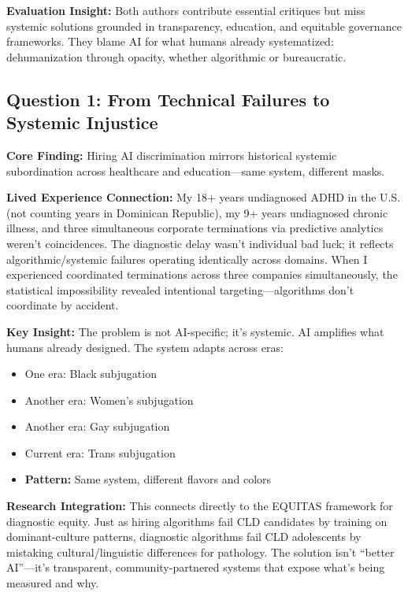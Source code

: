 \documentclass[12pt,letterpaper]{article}
\begin{document}
\vspace{-4pt}
\begin{criticalinsight}
\textbf{Evaluation Insight:} Both authors contribute essential critiques but miss systemic solutions grounded in transparency, education, and equitable governance frameworks. They blame AI for what humans already systematized: dehumanization through opacity, whether algorithmic or bureaucratic.
\end{criticalinsight}

\subsection*{Question 1: From Technical Failures to Systemic Injustice}

\textbf{Core Finding:} Hiring AI discrimination mirrors historical systemic subordination across healthcare and education—same system, different masks.

\begin{personalreflection}
\textbf{Lived Experience Connection:} My 18+ years undiagnosed ADHD in the U.S. (not counting years in Dominican Republic), my 9+ years undiagnosed chronic illness, and three simultaneous corporate terminations via predictive analytics weren't coincidences. The diagnostic delay wasn't individual bad luck; it reflects algorithmic/systemic failures operating identically across domains. When I experienced coordinated terminations across three companies simultaneously, the statistical impossibility revealed intentional targeting—algorithms don't coordinate by accident.
\end{personalreflection}

\textbf{Key Insight:} The problem is not AI-specific; it's systemic. AI amplifies what humans already designed. The system adapts across eras:

\begin{itemize}[leftmargin=*,noitemsep]
    \item One era: Black subjugation
    \item Another era: Women's subjugation
    \item Another era: Gay subjugation
    \item Current era: Trans subjugation
    \item \textbf{Pattern:} Same system, different flavors and colors
\end{itemize}

\begin{puzzleplan}
\textbf{Research Integration:} This connects directly to the EQUITAS framework for diagnostic equity. Just as hiring algorithms fail CLD candidates by training on dominant-culture patterns, diagnostic algorithms fail CLD adolescents by mistaking cultural/linguistic differences for pathology. The solution isn't ``better AI''—it's transparent, community-partnered systems that expose what's being measured and why.
\end{puzzleplan}
\end{document}
